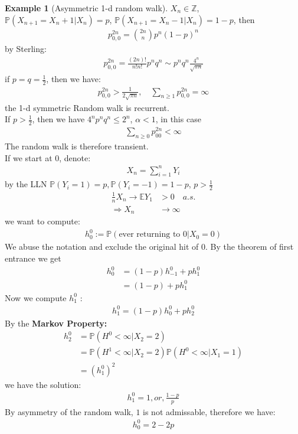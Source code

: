 \documentclass[a4paper,11pt]{book}
\theoremstyle{definition}
\newtheorem*{example}{Example}
\theoremstyle{remark}
\begin{document}
\begin{example}[Asymmetric 1-d random walk]
	$X_n \in \mathbb{Z}$, $\mathbb{P}(X_{n+1} = X_n + 1|X_n) = p$,  $\mathbb{P}(X_{n+1} = X_n - 1|X_n) = 1-p$, then
	\begin{align*}
		p_{0, 0}^{2n} = \binom{2n}{n} p^n(1-p)^n
	\end{align*}
	by Sterling:
	\begin{align*}
		p_{0, 0}^{2n} = \frac{(2n)!}{n!n!}p^n q^n \sim p^n q^n\frac{4^n}{\sqrt{\pi n}} 
	\end{align*}
	if $p = q = \frac{1}{2}$, then we have:
	\begin{align*}
		 p_{0, 0}^{2n} > \frac{1}{2 \sqrt{\pi n}}, \quad  \sum_{n \geq 1} p_{0, 0}^{2n} = \infty
	\end{align*}
	the 1-d symmetric Random walk is recurrent.\\
	If $p > \frac{1}{2}$, then we have $4^n p^n q^n \le 2^n$, $\alpha < 1$, in this case
	\begin{align*}
		\sum_{n \geq 0} p_{00}^{2n} < \infty
	\end{align*}
	The random walk is therefore transient.\\

	If we start at $0$, denote: 
	\begin{align*}
		X_n = \sum_{i = 1}^n Y_i 
	\end{align*}
	by the LLN
	$\mathbb{P}(Y_i = 1) = p, \mathbb{P}(Y_i = -1) = 1-p$, $p > \frac{1}{2}$
	\begin{align*}
		\frac{1}{n} X_n \rightarrow \mathbb{E}Y_1 &>0 \quad a.s.\\
		\Rightarrow  X_n &\rightarrow \infty
	\end{align*}
	we want to compute:
	\begin{align*}
		h^0_0:= \mathbb{P}(\text{ever returning to 0}|X_0 = 0)
	\end{align*}
	We abuse the notation and exclude the original hit of $0$. By the theorem of first entrance we get
	\begin{align*}
		h_0^0 &= (1 - p)h_{-1}^0 + ph_1^0\\
		&= (1 - p) + p h_1^0
	\end{align*}
	Now we compute $h_1^0$ :
	\begin{align*}
		h^0_1 = (1-p)h_0^0 + ph_2^0
	\end{align*}
	By the \textbf{Markov Property:}
	\begin{align*}
		h_2^0 &= \mathbb{P}(H^0< \infty|X_2 = 2) \\
		&= \mathbb{P}(H^1< \infty|X_2 = 2)\mathbb{P}(H^0 < \infty|X_1 = 1)\\
		&= (h_1^0)^2
	\end{align*}
	we have the solution:
	\begin{align*}
		h_1^0 = 1, or, \frac{1-p}{p}
	\end{align*}
	By asymmetry of the random walk, $1$ is not admissable, therefore we have:
	\begin{align*}
		h_0^0 = 2 - 2p
	\end{align*}
\end{example}
\end{document}
